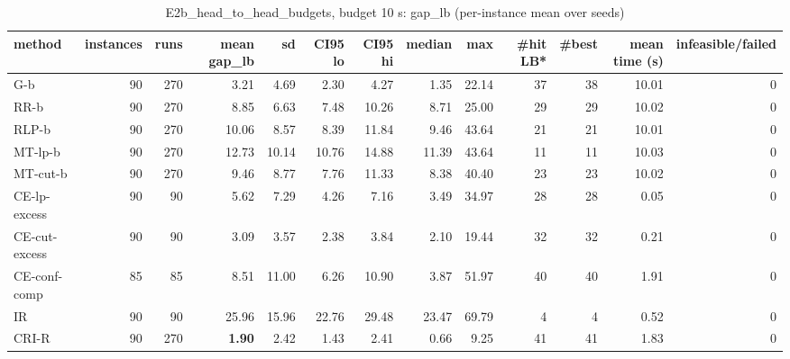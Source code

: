 \begin{table}[htbp]
\centering
\small
\caption{E2b\_head\_to\_head\_budgets, budget 10 s: gap\_lb (per-instance mean over seeds)}
\label{tab:E2b_head_to_head_budgets_b10_summary}
\begin{tabular}{lrrrrrrrrrrrr}
\toprule
method & instances & runs & mean gap\_lb & sd & CI95 lo & CI95 hi & median & max & \#hit LB* & \#best & mean time (s) & infeasible/failed \\
\midrule
G-b & 90 & 270 & 3.21 & 4.69 & 2.30 & 4.27 & 1.35 & 22.14 & 37 & 38 & 10.01 & 0 \\
RR-b & 90 & 270 & 8.85 & 6.63 & 7.48 & 10.26 & 8.71 & 25.00 & 29 & 29 & 10.02 & 0 \\
RLP-b & 90 & 270 & 10.06 & 8.57 & 8.39 & 11.84 & 9.46 & 43.64 & 21 & 21 & 10.01 & 0 \\
MT-lp-b & 90 & 270 & 12.73 & 10.14 & 10.76 & 14.88 & 11.39 & 43.64 & 11 & 11 & 10.03 & 0 \\
MT-cut-b & 90 & 270 & 9.46 & 8.77 & 7.76 & 11.33 & 8.38 & 40.40 & 23 & 23 & 10.02 & 0 \\
CE-lp-excess & 90 & 90 & 5.62 & 7.29 & 4.26 & 7.16 & 3.49 & 34.97 & 28 & 28 & 0.05 & 0 \\
CE-cut-excess & 90 & 90 & 3.09 & 3.57 & 2.38 & 3.84 & 2.10 & 19.44 & 32 & 32 & 0.21 & 0 \\
CE-conf-comp & 85 & 85 & 8.51 & 11.00 & 6.26 & 10.90 & 3.87 & 51.97 & 40 & 40 & 1.91 & 0 \\
IR & 90 & 90 & 25.96 & 15.96 & 22.76 & 29.48 & 23.47 & 69.79 & 4 & 4 & 0.52 & 0 \\
CRI-R & 90 & 270 & \textbf{1.90} & 2.42 & 1.43 & 2.41 & 0.66 & 9.25 & 41 & 41 & 1.83 & 0 \\
\bottomrule
\end{tabular}
\end{table}
